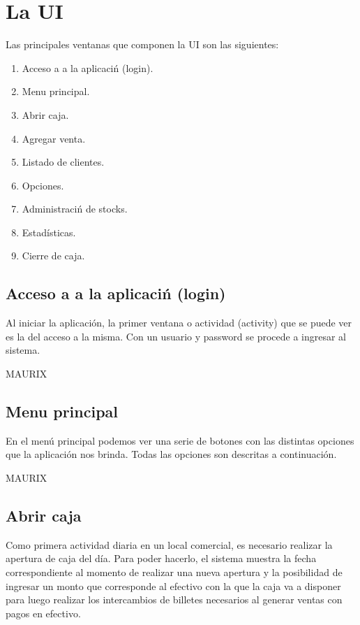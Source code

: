 \chapter{La \acf{UI}}
\label{sec:ui}

Las principales ventanas que componen la \ac{UI} son las siguientes:

\begin{enumerate}
\item Acceso a a la aplicaci\'n (login).
\item Menu principal. 
\item Abrir caja.
\item Agregar venta.
\item Listado de clientes.
\item Opciones.
\item Administraci\'n de stocks.
\item Estad\'isticas.
\item Cierre de caja.
\end{enumerate}

\section{Acceso a a la aplicaci\'n (login)}
\label{sec:ui.login}

Al iniciar la aplicaci\'on, la primer ventana o actividad (activity) que se puede ver es la del acceso a la misma. Con un usuario y password se procede a ingresar al sistema.

MAURIX

\section{Menu principal}
\label{sec:ui.mainmenu}

En el men\'u principal podemos ver una serie de botones con las distintas opciones que la aplicaci\'on nos brinda. Todas las opciones son descritas a continuaci\'on.

MAURIX

\section{Abrir caja}
\label{sec:ui.newcash}

Como primera actividad diaria en un local comercial, es necesario realizar la apertura de caja del d\'ia. Para poder hacerlo, el sistema muestra la fecha correspondiente al momento de realizar una nueva apertura y la posibilidad de ingresar un monto que corresponde al efectivo con la que la caja va a disponer para luego realizar los intercambios de billetes necesarios al generar ventas con pagos en efectivo.

